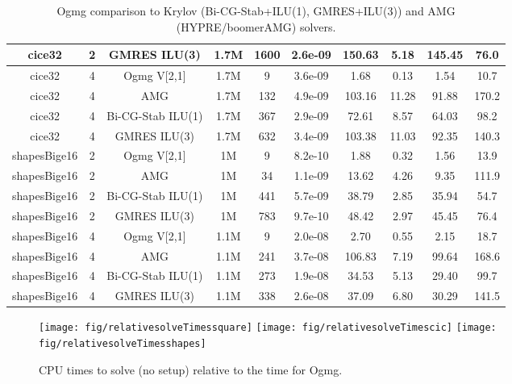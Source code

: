 \begin{table}[hbt]
\begin{center}
\begin{tabular}{|c|c|c|c|c|c|c|c|c|c|}
 cice32 &  2  &  GMRES ILU(3)      &   1.7M  & 1600  &    2.6e-09       &  150.63  &    5.18  &  145.45  &    76.0 \\
\hline
 cice32 &  4  &  Ogmg V[2,1]       &   1.7M  &    9  &    3.6e-09       &    1.68  &    0.13  &    1.54  &    10.7 \\
 cice32 &  4  &  AMG               &   1.7M  &  132  &    4.9e-09       &  103.16  &   11.28  &   91.88  &   170.2 \\
 cice32 &  4  &  Bi-CG-Stab ILU(1) &   1.7M  &  367  &    2.9e-09       &   72.61  &    8.57  &   64.03  &    98.2 \\
 cice32 &  4  &  GMRES ILU(3)      &   1.7M  &  632  &    3.4e-09       &  103.38  &   11.03  &   92.35  &   140.3 \\
\hline
 shapesBige16 &  2  &  Ogmg V[2,1]       &   1M  &    9  &    8.2e-10       &    1.88  &    0.32  &    1.56  &    13.9 \\
 shapesBige16 &  2  &  AMG               &   1M  &   34  &    1.1e-09       &   13.62  &    4.26  &    9.35  &   111.9 \\
 shapesBige16 &  2  &  Bi-CG-Stab ILU(1) &   1M  &  441  &    5.7e-09       &   38.79  &    2.85  &   35.94  &    54.7 \\
 shapesBige16 &  2  &  GMRES ILU(3)      &   1M  &  783  &    9.7e-10       &   48.42  &    2.97  &   45.45  &    76.4 \\
\hline
 shapesBige16 &  4  &  Ogmg V[2,1]       &   1.1M  &    9  &    2.0e-08       &    2.70  &    0.55  &    2.15  &    18.7 \\
 shapesBige16 &  4  &  AMG               &   1.1M  &  241  &    3.7e-08       &  106.83  &    7.19  &   99.64  &   168.6 \\
 shapesBige16 &  4  &  Bi-CG-Stab ILU(1) &   1.1M  &  273  &    1.9e-08       &   34.53  &    5.13  &   29.40  &    99.7 \\
 shapesBige16 &  4  &  GMRES ILU(3)      &   1.1M  &  338  &    2.6e-08       &   37.09  &    6.80  &   30.29  &   141.5 \\
\hline

\end{tabular}
\end{center}
\caption{Ogmg comparison to Krylov (Bi-CG-Stab+ILU(1), GMRES+ILU(3)) and AMG (HYPRE/boomerAMG) solvers. }
\label{tab:comparisonAMG} 
\end{table}


\begin{figure}[hbt]
\begin{center}
  \texttt{[image: fig/relativesolveTimessquare]}
  \texttt{[image: fig/relativesolveTimescic]}
  \texttt{[image: fig/relativesolveTimesshapes]}
  \end{center} 
\caption{CPU times to solve (no setup) relative to the time for Ogmg.}
\label{fig:relativeSolveTimes}
\end{figure}

